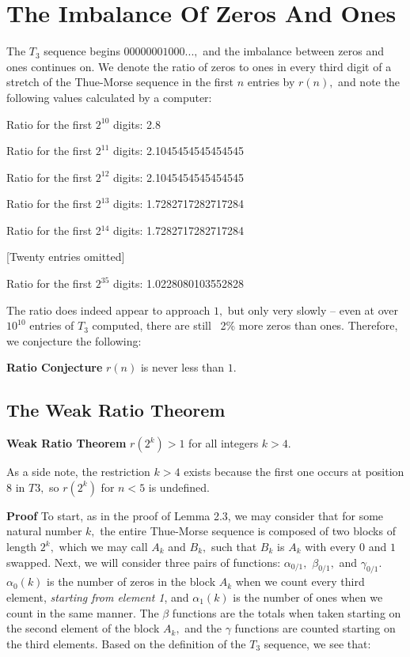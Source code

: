 \documentclass{article}
\begin{document}
\section{The Imbalance Of Zeros And Ones}

The $T_3$ sequence begins $00000001000...,$ and the imbalance between zeros and ones continues on. We denote the ratio of zeros to ones in every third digit of a stretch of the Thue-Morse sequence in the first $n$ entries by $r(n),$ and note the following values calculated by a computer:

Ratio for the first $2^{10}$ digits: 2.8

Ratio for the first $2^{11}$ digits: 2.1045454545454545

Ratio for the first $2^{12}$ digits: 2.1045454545454545

Ratio for the first $2^{13}$ digits: 1.7282717282717284

Ratio for the first 2$^{14}$ digits: 1.7282717282717284

[Twenty entries omitted]

Ratio for the first $2^{35}$ digits: 1.0228080103552828

The ratio does indeed appear to approach $1,$ but only very slowly -- even at over $10^{10}$ entries of $T_3$ computed, there are still ~2\% more zeros than ones. Therefore, we conjecture the following:

\textbf{Ratio Conjecture} $r(n)$ is never less than $1.$

\subsection{The Weak Ratio Theorem}

\textbf{Weak Ratio Theorem} $r(2^k) > 1$ for all integers $k > 4.$

As a side note, the restriction $k > 4$ exists because the first one occurs at position $8$ in $T3,$ so $r(2^k)$ for $n < 5$ is undefined.

\textbf{Proof} To start, as in the proof of Lemma 2.3, we may consider that for some natural number $k,$ the entire Thue-Morse sequence is composed of two blocks of length $2^k,$ which we may call $A_k$ and $B_k,$ such that $B_k$ is $A_k$ with every $0$ and $1$ swapped. Next, we will consider three pairs of functions: $\alpha_{0/1},$ $\beta_{0/1},$ and $\gamma_{0/1}.$ $\alpha_0(k)$ is the number of zeros in the block $A_k$ when we count every third element, \emph{starting from element 1}, and $\alpha_1(k)$ is the number of ones when we count in the same manner. The $\beta$ functions are the totals when taken starting on the second element of the block $A_k,$ and the $\gamma$ functions are counted starting on the third elements. Based on the definition of the $T_3$ sequence, we see that:
\end{document}
